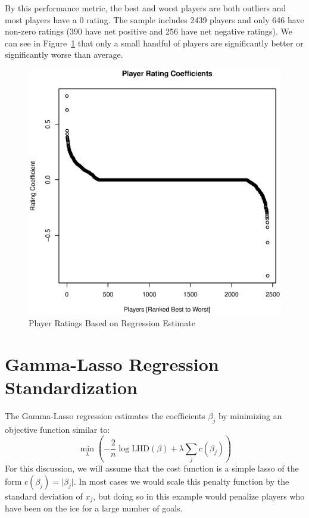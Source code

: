 \documentclass[11pt, fleqn]{article}
\begin{document}
By this performance metric, the best and worst players are both outliers and most players have a 0 rating. The sample includes 2439 players and only 646 have non-zero ratings (390 have net positive and 256 have net negative ratings). We can see in Figure~\ref{fig:play_rtg} that only a small handful of players are significantly better or significantly worse than average.

\begin{figure}[!htb]
  \centering
  \includegraphics[scale=.5]{player_rtg.eps}
  \caption{Player Ratings Based on Regression Estimate}
  \label{fig:play_rtg}
\end{figure}




\section{Gamma-Lasso Regression Standardization}

The Gamma-Lasso regression estimates the coefficients $\beta_j$ by minimizing an objective function similar to:
\[ \min_{\lambda} \left( -\frac{2}{n}\log \text{LHD}(\beta) + \lambda \sum_{j} c(\beta_j) \right) \]
For this discussion, we will assume that the cost function is a simple lasso of the form $c(\beta_j) = \lvert \beta_j \rvert$. In most cases we would scale this penalty function by the standard deviation of $x_j$, but doing so in this example would penalize players who have been on the ice for a large number of goals.
\end{document}

